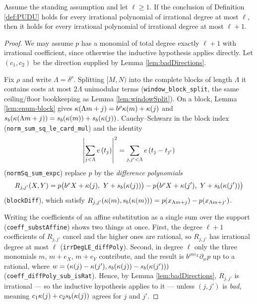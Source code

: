 \begin{theorem}
  \label{thm:UDstep}
  \leanok
  Assume the standing assumption and let $\ell \geq 1$. If the conclusion of
  Definition \ref{def:PUDU} holds for every irrational polynomial of
  irrational degree at most $\ell$, then it holds for every irrational
  polynomial of irrational degree at most $\ell + 1$.
\end{theorem}
\begin{proof}
  \leanok
  We may assume $p$ has a monomial of total degree exactly $\ell+1$ with
  irrational coefficient, since otherwise the inductive hypothesis applies
  directly. Let $(c_1,c_2)$ be the direction supplied by Lemma
  \ref{lem:badDirections}.

  Fix $\rho$ and write $\Lambda = \delta^\rho$. Splitting $[M,N)$ into the
  complete blocks of length $\Lambda$ it contains costs at most $2\Lambda$
  unimodular terms (\texttt{window\_block\_split}, the same ceiling/floor
  bookkeeping as Lemma \ref{lem:windowSplit}). On a block, Lemma
  \ref{lem:enum-block} gives
  $\kappa(\Lambda m + j) = b^\rho \kappa(m) + \kappa(j)$ and
  $s_b(\kappa(\Lambda m + j)) = s_b(\kappa(m)) + s_b(\kappa(j))$. Cauchy--Schwarz
  in the block index (\texttt{norm\_sum\_sq\_le\_card\_mul}) and the identity
  \[
    \left\lvert \sum_{j<\Lambda} e\left(t_j\right) \right\rvert^2
      = \sum_{j,j'<\Lambda} e\left(t_j - t_{j'}\right)
  \]
  (\texttt{normSq\_sum\_expc}) replace $p$ by the \emph{difference
  polynomials}
  \[
    R_{j,j'}(X,Y) = p\bigl(b^\rho X + \kappa(j),\ Y + s_b(\kappa(j))\bigr)
      - p\bigl(b^\rho X + \kappa(j'),\ Y + s_b(\kappa(j'))\bigr)
  \]
  (\texttt{blockDiff}), which satisfy
  $R_{j,j'}(\kappa(m), s_b(\kappa(m))) = p(x_{\Lambda m + j}) - p(x_{\Lambda m+j'})$.

  Writing the coefficients of an affine substitution as a single sum over the
  support (\texttt{coeff\_substAffine}) shows two things at once. First, the
  degree $\ell+1$ coefficients of $R_{j,j'}$ cancel and the higher ones are
  rational, so $R_{j,j'}$ has irrational degree at most $\ell$
  (\texttt{irrDegLE\_diffPoly}). Second, in degree $\ell$ only the three
  monomials $m$, $m + e_X$, $m + e_Y$ contribute, and the result is
  $b^{\rho m_X} \partial_w p$ up to a rational, where
  $w = (\kappa(j) - \kappa(j'), s_b(\kappa(j)) - s_b(\kappa(j')))$
  (\texttt{coeff\_diffPoly\_sub\_isRat}). Hence, by Lemma
  \ref{lem:badDirections}, $R_{j,j'}$ is irrational --- so the inductive
  hypothesis applies to it --- unless $(j,j')$ is \emph{bad}, meaning
  $c_1\kappa(j) + c_2s_b(\kappa(j))$ agrees for $j$ and $j'$.


\end{proof}
